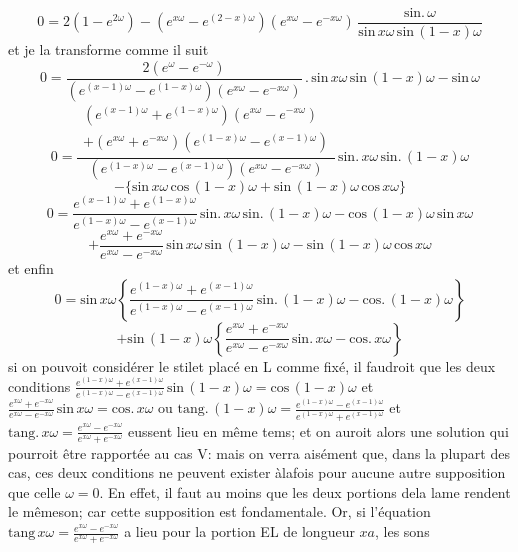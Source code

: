 \documentclass[11pt,a4paper]{article}
\begin{document}

\[ 0 = 2(1-e^{2\omega}) - (e^{x\omega} - e^{(2-x)\omega})(e^{x\omega} - e^{-x\omega})\,\frac{\text{sin.}\,\omega}{\text{sin}\,x\omega\,\text{sin}\,(1-x)\omega} \]
et je la transforme comme il suit
\[ 0 = \frac{2(e^{\omega} - e^{-\omega})}{(e^{(x-1)\omega} - e^{(1-x)\omega})(e^{x\omega} - e^{-x\omega})}\,.\,\text{sin}\,x\omega\,\text{sin}\,(1-x)\omega - \text{sin}\,\omega \]
\[ 0 = \frac{\begin{array}{c}(e^{(x-1)\omega} + e^{(1-x)\omega})(e^{x\omega} - e^{-x\omega}) \\  + (e^{x\omega} + e^{-x\omega})(e^{(1-x)\omega} - e^{(x-1)\omega})\end{array}}{(e^{(1-x)\omega} - e^{(x-1)\omega})(e^{x\omega} - e^{-x\omega})}\,\text{sin.}\,x\omega\,\text{sin.}\,(1-x)\omega \]
\[ - \{\text{sin}\,x\omega\,\text{cos}\,(1-x)\omega + \text{sin}\,(1-x)\omega\,\text{cos}\,x\omega\} \]
\[ 0 = \frac{e^{(x-1)\omega} + e^{(1-x)\omega}}{e^{(1-x)\omega} - e^{(x-1)\omega}}\,\text{sin.}\,x\omega\,\text{sin.}\,(1-x)\omega - \text{cos}\,(1-x)\omega\,\text{sin}\,x\omega \]
\[ + \frac{e^{x\omega} + e^{-x\omega}}{e^{x\omega} - e^{-x\omega}}\,\text{sin}\,x\omega\,\text{sin}\,(1-x)\omega - \text{sin}\,(1-x)\omega\,\text{cos}\,x\omega \]
et enfin
\[ 0 = \text{sin}\,x\omega\left\{\frac{e^{(1-x)\omega} + e^{(x-1)\omega}}{e^{(1-x)\omega} - e^{(x-1)\omega}}\,\text{sin.}\,(1-x)\omega - \text{cos.}\,(1-x)\omega\right\} \]
\[ + \text{sin}\,(1-x)\omega\left\{\frac{e^{x\omega} + e^{-x\omega}}{e^{x\omega} - e^{-x\omega}}\,\text{sin.}\,x\omega - \text{cos.}\,x\omega\right\} \]
si on pouvoit considérer le stilet placé en L comme fixé, il faudroit que
les deux conditions $\frac{e^{(1-x)\omega} + e^{(x-1)\omega}}{e^{(1-x)\omega} - e^{(x-1)\omega}}\,\text{sin}\,(1-x)\omega = \text{cos}\,(1-x)\omega$ et $\frac{e^{x\omega} + e^{-x\omega}}{e^{x\omega} - e^{-x\omega}}\,\text{sin}\,x\omega = \text{cos.}\,x\omega$
ou $\text{tang.}\,(1-x)\omega = \frac{e^{(1-x)\omega} - e^{(x-1)\omega}}{e^{(1-x)\omega} + e^{(x-1)\omega}}$ et $\text{tang.}\,x\omega = \frac{e^{x\omega} - e^{-x\omega}}{e^{x\omega} + e^{-x\omega}}$ eussent lieu
en même tems; et on auroit alors une solution qui pourroit être rapportée
au cas V: mais on verra aisément que, dans la plupart des cas, ces deux
conditions ne peuvent exister àlafois pour aucune autre supposition que celle $\omega = 0$.
En effet, il faut au moins que les deux portions dela lame rendent le
mêmeson; car cette supposition est fondamentale. Or, si l'équation
$\text{tang}\,x\omega = \frac{e^{x\omega} - e^{-x\omega}}{e^{x\omega} + e^{-x\omega}}$ a lieu pour la portion EL de longueur $xa$, les sons
\end{document}
